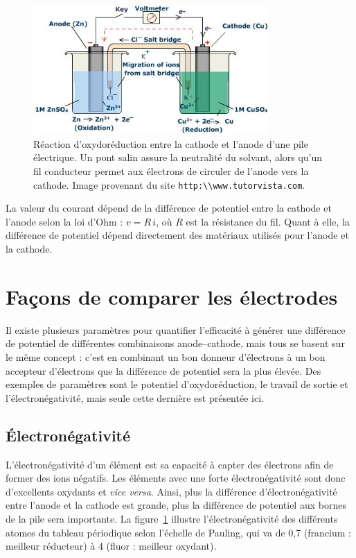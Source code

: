 \documentclass[12pt,oneside,letterpaper]{article}
\begin{document}
\begin{figure}[h]
\begin{center}
\includegraphics[width=0.8\textwidth]{L01_ElectricCell.jpeg}
\caption{\label{Pauling}Réaction d'oxydoréduction entre la cathode et l'anode d'une pile électrique. Un pont salin assure la neutralité du solvant, alors qu'un fil conducteur permet aux électrons de circuler de l'anode vers la cathode. Image provenant du site \texttt{http:\textbackslash\textbackslash www.tutorvista.com}.}
\end{center}
\end{figure}

La valeur du courant dépend de la différence de potentiel entre la cathode et l'anode selon la loi d'Ohm : $v=R\,i$, où $R$ est la résistance du fil. Quant à elle, la différence de potentiel dépend directement des matériaux utilisés pour l'anode et la cathode.


\section{Façons de comparer les électrodes}

Il existe plusieurs paramètres pour quantifier l'efficacité à générer une différence de potentiel de différentes combinaisons anode--cathode, mais tous se basent sur le même concept : c'est en combinant un bon donneur d'électrons à un bon accepteur d'électrons que la différence de potentiel sera la plus élevée. Des exemples de paramètres sont le potentiel d'oxydoréduction, le travail de sortie et l'électronégativité, mais seule cette dernière est présentée ici.

\subsection{Électronégativité}

L'électronégativité d'un élément est sa capacité à capter des électrons afin de former des ions négatifs. Les éléments avec une forte électronégativité sont donc d'excellents oxydants et \textit{vice versa}. Ainsi, plus la différence d'électronégativité entre l'anode et la cathode est grande, plus la différence de potentiel aux bornes de la pile sera importante. La figure~\ref{Pauling} illustre l'électronégativité des différents atomes du tableau périodique selon l'échelle de Pauling, qui va de 0,7 (francium : meilleur réducteur) à 4 (fluor : meilleur oxydant).
\end{document}
